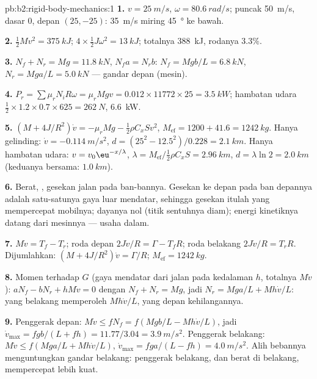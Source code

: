 \begin{solution}{pb:b2:rigid-body-mechanics:1}
\textbf{1.} $v = \qty{25}{m/s}$, $\omega = \qty{80.6}{rad/s}$; puncak \qty{50}{m/s},
dasar $0$, depan $(25, -25)$: \qty{35}{m/s} miring \qty{45}{\degree} ke bawah.

\textbf{2.} $\tfrac12Mv^2 = \qty{375}{kJ}$; $4 \times \tfrac12J\omega^2 = \qty{13}{kJ}$;
totalnya \qty{388}{kJ}, rodanya $3.3\%$.

\textbf{3.} $N_f + N_r = Mg = \qty{11.8}{kN}$, $N_fa = N_rb$: $N_f = Mgb/L =
\qty{6.8}{kN}$, $N_r = Mga/L = \qty{5.0}{kN}$ --- gandar depan (mesin).

\textbf{4.} $P_r = \sum\mu_rN_iR\omega = \mu_rMgv = 0.012 \times 11772 \times 25 =
\qty{3.5}{kW}$; hambatan udara $\tfrac12 \times 1.2 \times 0.7 \times 625 = \qty{262}{N}$, \qty{6.6}{kW}.

\textbf{5.} $(M + 4J/R^2)\dot v = -\mu_rMg - \tfrac12\rho C_xSv^2$, $M_{\text{ef}} =
1200 + 41.6 = \qty{1242}{kg}$. Hanya gelinding: $\dot v = \qty{-0.114}{m/s^2}$,
$d = (25^2 - 12.5^2)/0.228 = \qty{2.1}{km}$. Hanya hambatan udara: $v = v_0\eu^{-x/\lambda}$,
$\lambda = M_{\text{ef}}/\tfrac12\rho C_xS = \qty{2.96}{km}$, $d = \lambda\ln2 =
\qty{2.0}{km}$ (keduanya bersama: $\qty{1.0}{km}$).

\textbf{6.} Berat, , gesekan jalan pada ban-bannya.
Gesekan ke depan pada ban depannya adalah satu-satunya gaya luar
mendatar, sehingga gesekan itulah yang mempercepat mobilnya; dayanya nol
(titik sentuhnya diam); energi kinetiknya datang dari mesinnya --- usaha dalam.

\textbf{7.} $M\dot v = T_f - T_r$; roda depan $2J\dot v/R = \Gamma - T_fR$;
roda belakang $2J\dot v/R = T_rR$. Dijumlahkan: $(M + 4J/R^2)\dot v = \Gamma/R$;
$M_{\text{ef}} = \qty{1242}{kg}$.

\textbf{8.} Momen terhadap $G$ (gaya mendatar dari jalan pada kedalaman $h$,
totalnya $M\dot v$): $aN_f - bN_r + hM\dot v = 0$ dengan $N_f + N_r = Mg$, jadi
$N_r = Mga/L + Mh\dot v/L$: yang belakang memperoleh $Mh\dot v/L$, yang depan kehilangannya.

\textbf{9.} Penggerak depan: $M\dot v \le fN_f = f(Mgb/L - Mh\dot v/L)$, jadi
$\dot v_{\max} = fgb/(L + fh) = 11.77/3.04 = \qty{3.9}{m/s^2}$. Penggerak belakang:
$M\dot v \le f(Mga/L + Mh\dot v/L)$, $\dot v_{\max} = fga/(L - fh) = \qty{4.0}{m/s^2}$.
Alih bebannya menguntungkan gandar belakang: penggerak belakang, dan
berat di belakang, mempercepat lebih kuat.


\end{solution}
